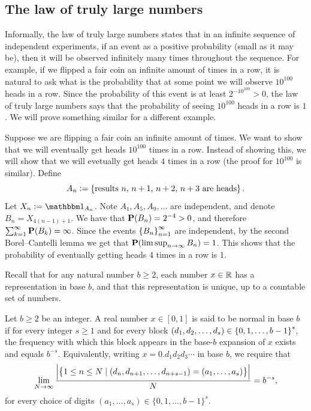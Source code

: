 \documentclass[11pt,a4paper]{article}
\begin{document}
\subsection{The law of truly large numbers}
Informally, the law of truly large numbers states that in an infinite
sequence of independent experiments, if an event as a positive
probability (small as it may be), then it will be observed infinitely
many times throughout the sequence.
For example, if we flipped a fair coin an infinite amount of times in a row,
it is natural to ask what is the probability that at some point
we will observe $10^{100}$ heads in a row.
Since the probability of this event is at least $2^{-10^{100}} > 0$,
the law of truly large numbers says that the probability of seeing
$10^{100}$ heads in a row is $1$.
We will prove something similar for a different example.

\begin{example}
  Suppose we are flipping a fair coin an infinite amount of times.
  We want to show that we will eventually get heads $10^{100}$ times
  in a row.
  Instead of showing this, we will show that we will evetually
  get heads $4$ times in a row (the proof for $10^{100}$ is similar).
  Define
  \[
    A_n := \left\{\text{results $n$, $n+1$, $n+2$, $n+3$ are heads}\right\}.
  \]
  Let $X_n := \ind_{A_n}$.
  Note $A_1,A_5,A_9,\dots$ are independent,
  and denote $B_n = X_{4(n-1) + 1}$.
  We have that $\mathbf{P}(B_n) = 2^{-4} > 0$,
  and therefore $\sum_{k=1}^{\infty} \mathbf{P}(B_k) = \infty$.
  Since the events $\left\{B_n\right\}_{n=1}^{\infty}$ are independent,
  by the second Borel--Cantelli lemma we get that
  $\mathbf{P}(\limsup_{n \to \infty} B_n) = 1$.
  This shows that the probability of eventually getting
  heads $4$ times in a row is $1$.
\end{example}

\begin{remark}
  Recall that for any natural number $b \geq 2$,
  each number $x \in \mathbb{R}$ has a representation in base $b$,
  and that this representation is unique, up to a countable set
  of numbers.
\end{remark}

\begin{definition}
  Let $b \geq 2$ be an integer.  
  A real number $x \in [0,1]$ is said to be normal in base $b$
  if for every integer $s \geq 1$ and for every block 
  $(d_1,d_2,\dots,d_s) \in \left\{0,1,\dots,b-1\right\}^s$,
  the frequency with which this block appears in the base-$b$ expansion of $x$
  exists and equals $b^{-s}$.  
  Equivalently, writing $x = 0.d_1d_2d_3\cdots$ in base $b$, we require that
  \[
    \lim_{N \to \infty}
    \frac{\left\lvert\left\{1 \leq n \leq N \mid (d_{n}, d_{n+1}, \dots, d_{n+s-1}) =
      (a_1,\dots,a_s)\right\}\right\rvert}{N}
    = b^{-s},
  \]
  for every choice of digits $(a_1,\dots,a_s) \in \{0,1,\dots,b-1\}^s$.
\end{definition}
\end{document}
